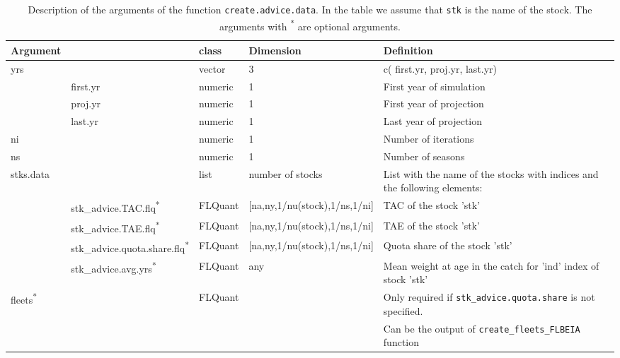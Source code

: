 \begin{landscape}
\begin{table}[!ht]
\begin{footnotesize}
\begin{threeparttable}
    \end{threeparttable}
  \end{footnotesize}

\end{table}

	

\begin{table}[!ht]

  \centering
  \begin{footnotesize}
    
    \caption{Description of the arguments of the function \texttt{create.advice.data}. 
      In the table we assume that \texttt{stk} is the name of the stock. 
      The arguments with \textsuperscript{*} are optional arguments.}
    
    \label{tb:A4.table6}
    
    \begin{threeparttable}
    
      \begin{tabular}{lllll} %
        \hline 
        Argument & & class & Dimension & Definition\\
        \hline
        yrs & & vector & 3 &	c( first.yr, proj.yr, last.yr)\\
          & first.yr & numeric & 1 & First year of simulation\\
          & proj.yr  & numeric & 1 & First year of projection\\
          & last.yr  & numeric & 1 & Last year of projection\\
        ni & & numeric &	1 &	Number of iterations\\
        ns & & numeric &	1 &	Number of seasons\\
        stks.data & &	list & number of stocks &	List with the name of the stocks with indices and the following elements:\\

          & stk\_advice.TAC.flq\textsuperscript{*} &	FLQuant &	[na,ny,1/nu(stock),1/ns,1/ni] &	TAC of the stock 'stk'\\
          & stk\_advice.TAE.flq\textsuperscript{*} &	FLQuant &	[na,ny,1/nu(stock),1/ns,1/ni] &	TAE of the stock 'stk'\\
          & stk\_advice.quota.share.flq\textsuperscript{*} &	FLQuant &	[na,ny,1/nu(stock),1/ns,1/ni] &	Quota share of the stock 'stk'\\
          & stk\_advice.avg.yrs\textsuperscript{*} &	FLQuant &	any &	Mean weight at age in the catch for 'ind' index of stock 'stk'\\
        fleets\textsuperscript{*} & & FLQuant &	 &	Only required if \texttt{stk\_advice.quota.share} is not specified.\\
         & & & & Can be the output of \texttt{create\_fleets\_FLBEIA} function\\
        \hline
      \end{tabular}
      

\end{threeparttable}
\end{footnotesize}
\end{table}
\end{landscape}
